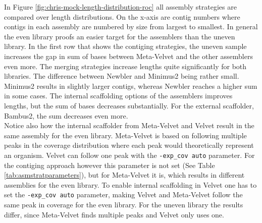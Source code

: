 \documentclass[a4paper,12pt]{report}
\begin{document}
In Figure \ref{fig:chris-mock-length-distribution-roc} all assembly strategies
are compared over length distributions. On the x-axis are contig numbers where
contigs in each assembly are numbered by size from largest to smallest. In
general the even library proofs an easier target for the assemblers than the
uneven library. In the first row that shows the contiging strategies, the
uneven sample increases the gap in sum of bases between Meta-Velvet and the
other assemblers even more. The merging strategies increase lengths quite
significantly for both libraries. The difference between Newbler and Minimus2
being rather small. Minimus2 results in slightly larger contigs, whereas
Newbler reaches a higher sum in some cases. The internal scaffolding options of
the assemblers improves lengths, but the sum of bases decreases substantially.
For the external scaffolder, Bambus2, the sum decreases even more.\\


Notice also how the internal scaffolder from Meta-Velvet and Velvet result in
the same assembly for the even library. Meta-Velvet is based on following
multiple peaks in the coverage distribution where each peak would theoretically
represent an organism. Velvet can follow one peak with the \verb!-exp_cov auto!
parameter. For the contiging approach however this parameter is not set (See
Table \ref{tab:asmstratparameters}), but for Meta-Velvet it is, which results
in different assemblies for the even library.  To enable internal scaffolding
in Velvet one has to set the \verb!-exp_cov auto!  parameter, making Velvet and
Meta-Velvet follow the same peak in coverage for the even library. For the
uneven library the results differ, since Meta-Velvet finds multiple peaks and
Velvet only uses one. 
\end{document}
